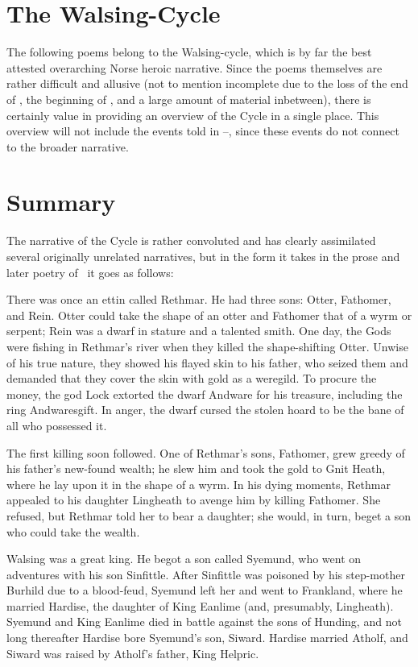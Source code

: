 
\section{The Walsing-Cycle}

The following poems belong to the Walsing-cycle, which is by far the best attested overarching Norse heroic narrative.  Since the poems themselves are rather difficult and allusive (not to mention incomplete due to the loss of the end of , the beginning of , and a large amount of material inbetween), there is certainly value in providing an overview of the Cycle in a single place.  This overview will not include the events told in \HelgakvidaOne--\HelgakvidaTwo, since these events do not connect to the broader narrative.

\section{Summary}

The narrative of the Cycle is rather convoluted and has clearly assimilated several originally unrelated narratives, but in the form it takes in the prose and later poetry of \Regius\ it goes as follows:

There was once an ettin called Rethmar.  He had three sons: Otter, Fathomer, and Rein.  Otter could take the shape of an otter and Fathomer that of a wyrm or serpent; Rein was a dwarf in stature and a talented smith.  One day, the Gods were fishing in Rethmar’s river when they killed the shape-shifting Otter.  Unwise of his true nature, they showed his flayed skin to his father, who seized them and demanded that they cover the skin with gold as a weregild.  To procure the money, the god Lock extorted the dwarf Andware for his treasure, including the ring Andwaresgift.  In anger, the dwarf cursed the stolen hoard to be the bane of all who possessed it.

The first killing soon followed.  One of Rethmar’s sons, Fathomer, grew greedy of his father’s new-found wealth; he slew him and took the gold to Gnit Heath, where he lay upon it in the shape of a wyrm.  In his dying moments, Rethmar appealed to his daughter Lingheath to avenge him by killing Fathomer.  She refused, but Rethmar told her to bear a daughter; she would, in turn, beget a son who could take the wealth.

Walsing was a great king.  He begot a son called Syemund, who went on adventures with his son Sinfittle.  After Sinfittle was poisoned by his step-mother Burhild due to a blood-feud, Syemund left her and went to Frankland, where he married Hardise, the daughter of King Eanlime (and, presumably, Lingheath).  Syemund and King Eanlime died in battle against the sons of Hunding, and not long thereafter Hardise bore Syemund’s son, Siward.  Hardise married Atholf, and Siward was raised by Atholf’s father, King Helpric.

